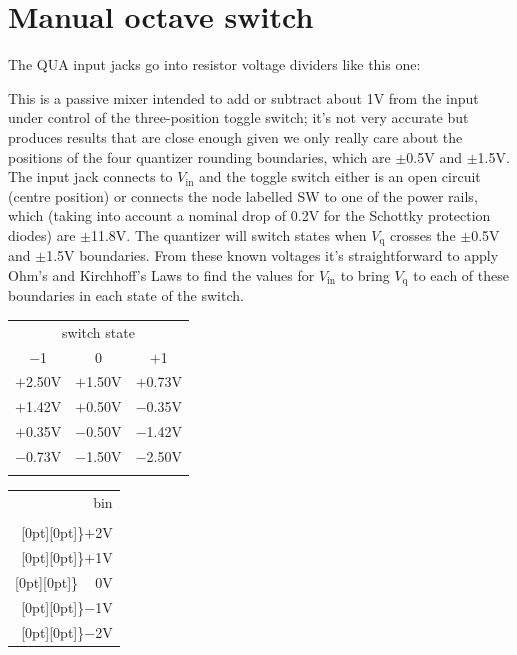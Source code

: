 \section{Manual octave switch}

The QUA input jacks go into resistor voltage dividers like this one:

{\centering\par}

This is a passive mixer intended to add or subtract about 1V from the input
under control of the three-position toggle switch; it's not very accurate
but produces results that are close enough given we only really care about
the positions of the four quantizer rounding boundaries, which are $\pm$0.5V
and $\pm$1.5V.  The input jack connects to $V_\textrm{in}$ and the toggle
switch either is an open circuit (centre position) or connects the node
labelled SW to one of the power rails, which (taking into account a nominal
drop of 0.2V for the Schottky protection diodes) are $\pm$11.8V.  The
quantizer will switch states when $V_\textrm{q}$ crosses the $\pm$0.5V and
$\pm$1.5V boundaries.  From these known voltages it's straightforward to
apply Ohm's and Kirchhoff's Laws to find the values for $V_\textrm{in}$ to
bring $V_\textrm{q}$ to each of these boundaries in each state of the
switch.

\vspace{\baselineskip}

\begin{tabular}{c|c|c}
  \multicolumn{3}{c}{switch state} \\
  $-$1 & 0 & $+$1\\ \hline
  $+$2.50V & $+$1.50V & $+$0.73V \\
  $+$1.42V & $+$0.50V & $-$0.35V \\
  $+$0.35V & $-$0.50V & $-$1.42V \\
  $-$0.73V & $-$1.50V & $-$2.50V \\
  \multicolumn{3}{c}{\quad}
\end{tabular}
\begin{tabular}{r}
  bin \\
  \quad \\
  \raisebox{1.6ex}[0pt][0pt]{\}$+$2V} \\
  \raisebox{1.6ex}[0pt][0pt]{\}$+$1V} \\
  \raisebox{1.6ex}[0pt][0pt]{\}$\phantom{+}$0V} \\
  \raisebox{1.6ex}[0pt][0pt]{\}$-$1V} \\
  \raisebox{1.6ex}[0pt][0pt]{\}$-$2V}
\end{tabular}

